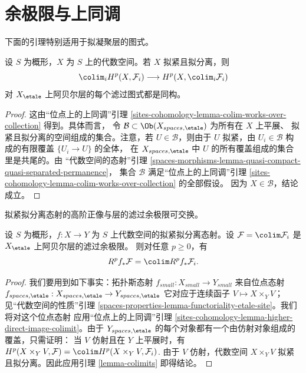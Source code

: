 \section{余极限与上同调}
\label{section-colimits}

\noindent
下面的引理特别适用于拟凝聚层的图式。

\begin{lemma}
\label{lemma-colimits}
设 $S$ 为概形，$X$ 为 $S$ 上的代数空间。若 $X$ 拟紧且拟分离，则
$$
\colim_i H^p(X, \mathcal{F}_i)
\longrightarrow
H^p(X, \colim_i \mathcal{F}_i)
$$
对 $X_\etale$ 上阿贝尔层的每个滤过图式都是同构。
\end{lemma}

\begin{proof}
这由“位点上的上同调”引理
\ref{sites-cohomology-lemma-colim-works-over-collection} 得到。具体而言，
令 $\mathcal{B} \subset \Ob(X_{spaces, \etale})$ 为所有在 $X$ 上平展、
拟紧且拟分离的空间组成的集合。注意，若 $U \in \mathcal{B}$，则由于 $U$
拟紧，由 $U_i \in \mathcal{B}$ 构成的有限覆盖 $\{U_i \to U\}$ 的全体，
在 $X_{spaces, \etale}$ 中 $U$ 的所有覆盖组成的集合里是共尾的。由
“代数空间的态射”引理
\ref{spaces-morphisms-lemma-quasi-compact-quasi-separated-permanence}，
集合 $\mathcal{B}$ 满足“位点上的上同调”引理
\ref{sites-cohomology-lemma-colim-works-over-collection} 的全部假设。
因为 $X \in \mathcal{B}$，结论成立。
\end{proof}

\begin{lemma}
\label{lemma-colimit-cohomology}
\begin{slogan}
拟紧拟分离态射的高阶正像与层的滤过余极限可交换。
\end{slogan}
设 $S$ 为概形，$f : X \to Y$ 为 $S$ 上代数空间的拟紧拟分离态射。设
$\mathcal{F} = \colim \mathcal{F}_i$ 是 $X_\etale$ 上阿贝尔层的滤过余极限。
则对任意 $p \geq 0$，有
$$
R^pf_*\mathcal{F} = \colim R^pf_*\mathcal{F}_i.
$$
\end{lemma}

\begin{proof}
我们要用到如下事实：拓扑斯态射 $f_{small} : X_{small} \to Y_{small}$
来自位点态射
$f_{spaces, \etale} : X_{spaces, \etale} \to Y_{spaces, \etale}$
它对应于连续函子 $V \longmapsto X \times_Y V$；见“代数空间的性质”引理
\ref{spaces-properties-lemma-functoriality-etale-site}。我们将对这个位点态射
应用“位点上的上同调”引理
\ref{sites-cohomology-lemma-higher-direct-image-colimit}。由于
$Y_{spaces, \etale}$ 的每个对象都有一个由仿射对象组成的覆盖，只需证明：
当 $V$ 仿射且在 $Y$ 上平展时，有
$H^p(X \times_Y V, \mathcal{F}) = \colim H^p(X \times_Y V, \mathcal{F}_i)$.
由于 $V$ 仿射，代数空间 $X \times_Y V$ 拟紧且拟分离。因此应用引理
\ref{lemma-colimits} 即得结论。
\end{proof}


